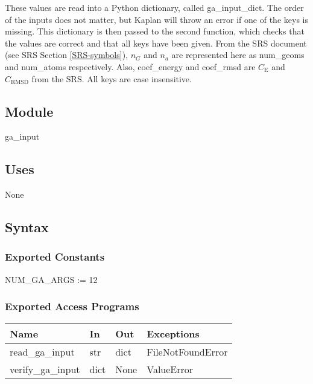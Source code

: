 \documentclass[12pt, titlepage]{article}
\newcommand{\progname}{Kaplan}
\begin{document}
These values are read into a Python dictionary, called ga\_input\_dict. The 
order of the inputs does not matter, but \progname{} will throw an error if one 
of the keys is missing. This dictionary is then passed to the second function, 
which checks that the values are correct and that all keys have been given. 
From the SRS document (see SRS Section \ref{SRS-symbols}),  $n_G$ and $n_a$ are 
represented here as num\_geoms and num\_atoms respectively. Also, coef\_energy 
and coef\_rmsd are $C_\text{E}$ and $C_\text{RMSD}$ from the SRS. All keys are 
case insensitive.

 

\subsection{Module}

ga\_input

\subsection{Uses}

None

\subsection{Syntax}

\subsubsection{Exported Constants}

NUM\_GA\_ARGS := 12

\subsubsection{Exported Access Programs}

\begin{table}[H]
	\begin{tabular}{p{4cm} p{2cm} p{2cm} p{5cm}}
		\toprule
		\textbf{Name} & \textbf{In} & \textbf{Out} & \textbf{Exceptions} \\
		\hline
		read\_ga\_input   & str  & dict & FileNotFoundError \\
		verify\_ga\_input & dict & None    & ValueError \\
		\bottomrule
	\end{tabular}
\end{table}
\end{document}
